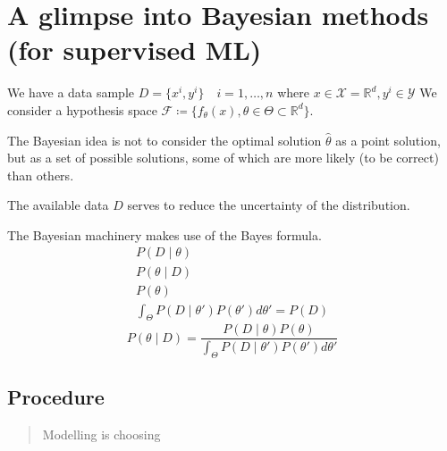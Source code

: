 \section[A glimpse into Bayesian methods]{A glimpse into Bayesian methods (for supervised ML)}

We have a data sample \(D = \{ x^i, y^i\}\quad i = 1, \dots, n\)
where \(x \in \mathcal{X} = \mathds{R}^d, y^i \in \mathcal{Y}\)
We consider a hypothesis space
\(\mathcal{F} \coloneqq \{ f_\theta (x), \theta \in \Theta \subset \mathds{R}^d \}\).

The Bayesian idea is not to consider the optimal solution
\(\hat{\theta}\) as a point solution, but as a set of possible solutions,
some of which are more likely (to be correct) than others.

The available data \(D\) serves to reduce the uncertainty of the
distribution.

The Bayesian machinery makes use of the Bayes formula.
%
\begin{align*}
	P(D \mid \theta) \tag{likelihood} \\
	P(\theta \mid D) \tag{posterior}  \\
	P(\theta) \tag{prior}          \\
	\int_\Theta P(D \mid \theta') P(\theta') d\theta' = P(D) \tag{EXPECTED \equiv EVIDENCE}
\end{align*}
%
\[
	P(\theta \mid D) = \frac{P(D \mid \theta) P(\theta)}
	{ \int_\Theta P(D \mid \theta') P(\theta') d\theta' }
\]

\subsection{Procedure}

\begin{quote}
	Modelling is choosing
\end{quote}

